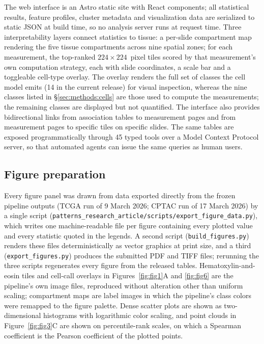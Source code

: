 The web interface is an Astro static site with React components; all statistical
results, feature profiles, cluster metadata and visualization data are serialized
to static JSON at build time, so no analysis server runs at request time. Three
interpretability layers connect statistics to tissue: a per-slide compartment map
rendering the five tissue compartments across nine spatial zones; for each
measurement, the top-ranked $224 \times 224$~pixel tiles scored by that
measurement's own computation strategy, each with slide coordinates, a scale bar
and a toggleable cell-type overlay. The overlay renders the full set of classes
the cell model emits (14 in the current release) for visual inspection, whereas
the nine classes listed in \S\ref{sec:methods:cells} are those used to compute
the measurements; the remaining classes are displayed but not quantified. The
interface also provides bidirectional links from association
tables to measurement pages and from measurement pages to specific tiles on
specific slides. The same tables are exposed programmatically through 45 typed
tools over a Model Context Protocol server, so that automated agents can issue
the same queries as human users.

\subsection{Figure preparation}
\label{sec:methods:figures}

Every figure panel was drawn from data exported directly from the frozen pipeline
outputs (TCGA run of 9 March 2026; CPTAC run of 17 March 2026) by a single script
(\texttt{patterns\_research\_article/scripts/export\_figure\_data.py}), which writes
one machine-readable file per figure containing every plotted value and every
statistic quoted in the legends. A second script
(\texttt{build\_figures.py}) renders these files deterministically as vector
graphics at print size, and a third (\texttt{export\_figures.py}) produces the
submitted PDF and TIFF files; rerunning the three scripts regenerates every
figure from the released tables. Hematoxylin-and-eosin tiles and cell-call overlays in
Figures~\ref{fig:fig1}A and \ref{fig:fig6} are the pipeline's own image files,
reproduced without alteration other than uniform scaling; compartment maps are
label images in which the pipeline's class colors were remapped to the figure
palette. Dense scatter plots are shown as two-dimensional histograms with
logarithmic color scaling, and point clouds in Figure~\ref{fig:fig3}C are shown on
percentile-rank scales, on which a Spearman coefficient is the Pearson coefficient
of the plotted points.
